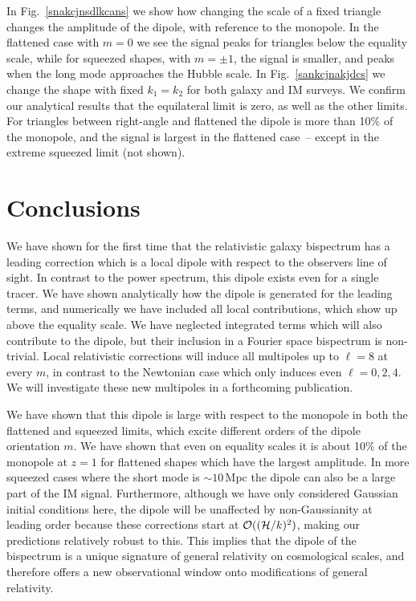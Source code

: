 In Fig.~\eqref{snakcjnsdlkcans} we show how changing the scale of a fixed triangle changes the amplitude of the dipole, with reference to the monopole. In the flattened case with $m=0$ we see the signal peaks for triangles below the equality scale, while for squeezed shapes, with $m=\pm1$, the signal is smaller, and peaks when the long mode approaches the Hubble scale. 
In Fig.~\eqref{sankcjnakjdcs} we change the shape with fixed $k_1=k_2$ for both galaxy and IM surveys. We confirm our analytical results that the equilateral limit is zero, as well as the other limits. For triangles between right-angle and flattened the dipole is more than 10\% of the monopole, and the signal is largest in the flattened case~-- except in the extreme squeezed limit (not shown). 


\section{Conclusions}

We have shown for the first time that the relativistic galaxy bispectrum has a leading correction which is a local dipole with respect to the observers line of sight. In contrast to the power spectrum, this dipole exists even for a single tracer. We have shown analytically how the dipole is generated for the leading terms, and numerically we have included all local contributions, which show up above the equality scale. We have neglected integrated terms which will also contribute to the dipole, but their inclusion in a Fourier space bispectrum is non-trivial. Local relativistic corrections will induce all multipoles up to $\ell=8$ at every $m$, in contrast to the Newtonian case which only induces even $\ell=0,2,4$. We will investigate these new multipoles in a forthcoming publication. 

We have shown that this dipole is large with respect to the monopole in both the flattened and squeezed limits, which excite different orders of the dipole orientation $m$.  We have shown that even on equality scales it is about 10\% of the monopole at $z=1$ for flattened shapes which have the largest amplitude. In more squeezed cases where the short mode is $\sim10$\,Mpc the dipole can also be a large part of the IM signal. Furthermore, although we have only considered Gaussian initial conditions here, the dipole will be unaffected by non-Gaussianity at leading order because these corrections start at $\mathcal{O}((\mathcal{H}/k)^2)$, making our predictions relatively robust to this. This implies that the dipole of the bispectrum is a unique signature of general relativity on cosmological scales, and therefore offers a new observational window onto modifications of general relativity. 




